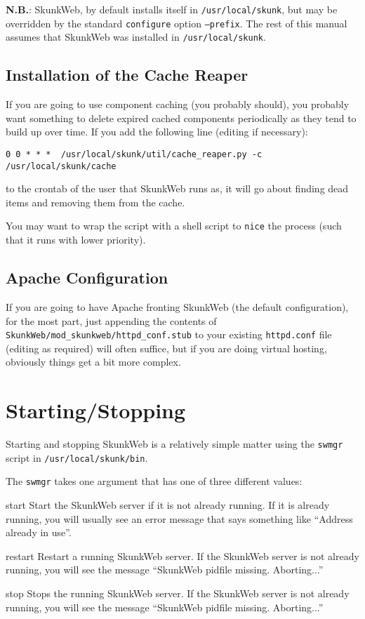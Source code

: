 \documentclass[titlepage]{manual}
\begin{document}
\textbf{N.B.}: SkunkWeb, by default installs itself in
  \texttt{/usr/local/skunk}, but may be overridden by the standard
  \texttt{configure} option \texttt{--prefix}.  The rest of this manual assumes
that SkunkWeb was installed in   \texttt{/usr/local/skunk}.

\section{Installation of the Cache Reaper}
If you are going to use component caching (you probably should), you
probably want something to delete expired cached components
periodically as they tend to build up over time.  If you add the
following line (editing if necessary):
\begin{verbatim}
0 0 * * *  /usr/local/skunk/util/cache_reaper.py -c /usr/local/skunk/cache
\end{verbatim}
to the crontab of the user that
SkunkWeb runs as, it will go about finding dead items and removing
them from the cache.  

You may want to wrap the script with a shell script to \texttt{nice}
the process (such that it runs with lower priority).

\section{Apache Configuration}
If you are going to have Apache fronting SkunkWeb (the default
configuration), for the most part, just appending the contents of
\texttt{SkunkWeb/mod_skunkweb/httpd_conf.stub} to your existing
\texttt{httpd.conf} file (editing as required) will often suffice, but
if you are doing virtual hosting, obviously things get a bit more
complex.

\chapter{Starting/Stopping}
Starting and stopping SkunkWeb is a relatively simple matter using 
the \texttt{swmgr} script in \texttt{/usr/local/skunk/bin}.

The \texttt{swmgr} takes one argument that has one of three different values:

\begin{argdesc}
\item[start] Start the SkunkWeb server if it is not already running.
If it is already running, you will usually see an error message that
says something like ``Address already in use''.

\item[restart] Restart a running SkunkWeb server.  If the SkunkWeb
server is not already running, you will see the message ``SkunkWeb
pidfile missing. Aborting...''

\item[stop] Stops the running SkunkWeb server.  If the SkunkWeb
server is not already running, you will see the message ``SkunkWeb
pidfile missing. Aborting...''

\end{argdesc}
\end{document}
